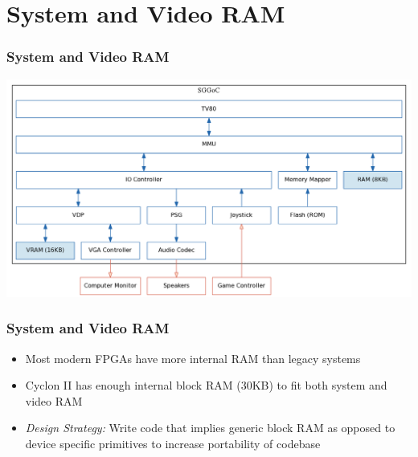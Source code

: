 \documentclass{beamer}
\newlength{\wideitemsep}
\let\olditem\item
\renewcommand{\item}{\setlength{\itemsep}{\wideitemsep}\olditem}
\begin{document}
\section{System and Video RAM}
\begin{frame}
    \frametitle{System and Video RAM}
    \begin{center}
        \includegraphics[width=\textwidth]{../block_diagrams/block_diagram_internal_ram.png}
    \end{center}
\end{frame}

\begin{frame}
    \frametitle{System and Video RAM}

    \begin{itemize}
        \item<1-> Most modern FPGAs have more internal RAM than legacy systems
        \item<2-> Cyclon II has enough internal block RAM (30KB) to fit both system and video RAM
        \item<3-> \emph{Design Strategy:} Write code that implies generic block RAM as opposed to device specific
            primitives to increase portability of codebase
    \end{itemize}
    \vspace{0.5cm}

\end{frame}
\end{document}
